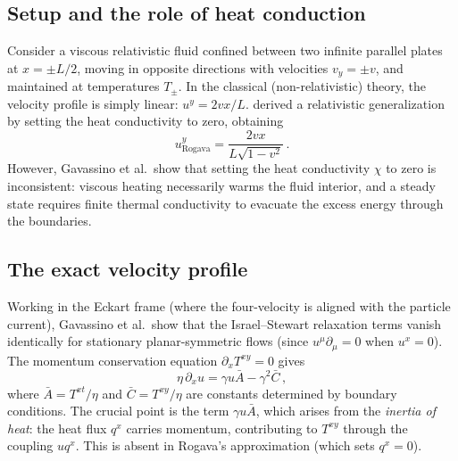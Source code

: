 \subsection{Setup and the role of heat conduction}
\label{sec:rel-7-gavassino-setup}

Consider a viscous relativistic fluid confined between two infinite parallel
plates at $x = \pm L/2$, moving in opposite directions with velocities
$v_y = \pm v$, and maintained at temperatures $T_{\pm}$.  In
the classical (non-relativistic) theory, the velocity profile is simply
linear: $u^y = 2vx/L$.  \citet{Rogava1996} derived a relativistic
generalization by setting the heat conductivity to zero, obtaining
\begin{equation}
\label{eq:rel-7-rogava}
u^y_{\text{Rogava}} = \frac{2vx}{L\sqrt{1-v^2}}\,.
\end{equation}
However, Gavassino et al.\ show that setting the heat conductivity $\chi$ to
zero is inconsistent: viscous heating necessarily warms the fluid interior,
and a steady state requires finite thermal conductivity to evacuate the
excess energy through the boundaries.

\subsection{The exact velocity profile}
\label{sec:rel-7-gavassino-velocity}

Working in the Eckart frame (where the four-velocity is aligned with the
particle current), Gavassino et al.\ show that the Israel--Stewart
relaxation terms vanish identically for stationary planar-symmetric
flows (since $u^\mu \partial_\mu = 0$ when $u^x = 0$).  The momentum
conservation equation $\partial_x T^{xy} = 0$ gives
\begin{equation}
\label{eq:rel-7-gavassino-ode}
\eta \,\partial_x u = \gamma u \bar{A} - \gamma^2 \bar{C}\,,
\end{equation}
where $\bar{A} = T^{xt}/\eta$ and $\bar{C} = T^{xy}/\eta$ are
constants determined by boundary conditions.
The crucial point is the term $\gamma u \bar{A}$, which arises from the
\emph{inertia of heat}: the heat flux $q^x$ carries momentum, contributing
to $T^{xy}$ through the coupling $u q^x$.  This is absent in
Rogava's approximation (which sets $q^x = 0$).

